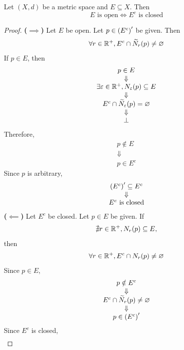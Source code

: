 \bigskip

\begin{theorem} \label{an:thm:open-set-complement-is-closed-set}
    Let $(X, d)$ be a metric space and $E \subseteq X$. Then
    \[
    E \text{ is open} \iff E^{c} \text{ is closed}
    \]
\end{theorem}

\begin{proof}
    \textbf{($\implies$)} Let $E$ be open. Let $p \in \paren*{E^{c}}'$ be given. Then
    \[
    \forall r \in \R^{+}, E^{c} \cap \widetilde{N}_{r}(p) \neq \vnot
    \]
    If $p \in E$, then
    \[
    \begin{array}{c}
        p \in E \\
        \Downarrow \\
        \exists \veps \in \R^{+}, N_{\veps}(p) \subseteq E \\
        \Downarrow \\
        E^{c} \cap \widetilde{N}_{\veps}(p) = \vnot \\
        \Downarrow \\
        \bot
    \end{array}
    \]
    Therefore,
    \[
    \begin{array}{c}
        p \notin E \\
        \Downarrow \\
        p \in E^{c}
    \end{array}
    \]
    Since $p$ is arbitrary,
    \[
    \begin{array}{c}
        \paren*{E^{c}}' \subseteq E^{c} \\
        \Downarrow \\
        E^{c} \text{ is closed}
    \end{array}
    \]
    \textbf{($\impliedby$)} Let $E^{c}$ be closed. Let $p \in E$ be given. If
    \[
    \nexists r \in \R^{+}, N_{r}(p) \subseteq E,
    \]
    then
    \[
    \forall r \in \R^{+}, E^{c} \cap N_{r}(p) \neq \vnot
    \]
    Since $p \in E$,
    \[
    \begin{array}{c}
        p \notin E^{c} \\
        \Downarrow \\
        E^{c} \cap \widetilde{N}_{r}(p) \neq \vnot \\
        \Downarrow \\
        p \in \paren*{E^{c}}'
    \end{array}
    \]
    Since $E^{c}$ is closed,
    \[
    \begin{array}{c}

\end{array}\]
\end{proof}
